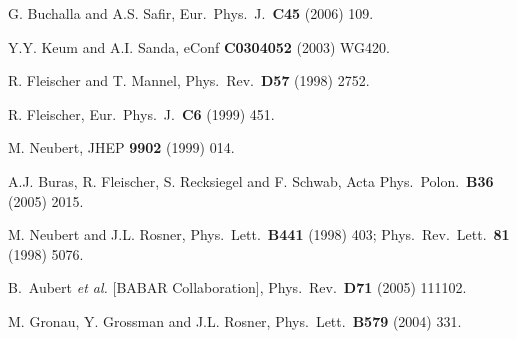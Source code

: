 \documentclass[12pt]{article}
\begin{document}
\begin{thebibliography}{999}
G. Buchalla and A.S. Safir,
 Eur.\ Phys.\ J.\  {\bf C45} (2006) 109.

Y.Y. Keum and A.I. Sanda,
  { eConf} {\bf C0304052} (2003) WG420.
  
  R. Fleischer and T. Mannel,
{ Phys.\ Rev.}~{\bf D57} (1998) 2752.

R. Fleischer,
{ Eur.\ Phys.\ J.}~{\bf C6} (1999) 451.

M. Neubert,
{ JHEP} {\bf 9902} (1999) 014.

A.J. Buras, R. Fleischer, S. Recksiegel and F. Schwab,
{ Acta Phys.\ Polon.}~{\bf B36} (2005) 2015.
  
M. Neubert and J.L. Rosner,
{ Phys.\ Lett.}~{\bf B441} (1998) 403;
{ Phys.\ Rev.\ Lett.}~{\bf 81} (1998) 5076.

B.~Aubert {\it et al.}  [BABAR Collaboration],
 { Phys.\ Rev.}~{\bf D71} (2005) 111102.
  
M. Gronau, Y. Grossman and J.L. Rosner,
  { Phys.\ Lett.}~{\bf B579} (2004) 331.


\end{thebibliography}
\end{document}

